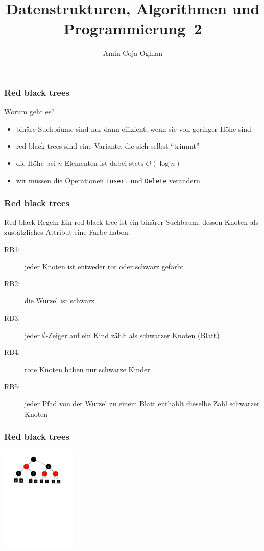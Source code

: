 \documentclass[aspectratio=1610, 11pt]{beamer}
\title{Datenstrukturen, Algorithmen und Programmierung~2}
\author[A.~Coja-Oghlan]{Amin Coja-Oghlan}
\institute[DAP2]{Lehrstuhl Informatik 2\\Fakult\"at f\"ur Informatik}
\newcommand{\mytitle}{Red black trees}
\begin{document}
\frame[plain]{\titlepage}

\begin{frame}\frametitle{\mytitle}
	\begin{exampleblock}{Worum geht es?}
		\begin{itemize}
			\item bin\"are Suchb\"aume sind nur dann effizient, wenn sie von geringer H\"ohe sind
			\item red black trees sind eine Variante, die sich selbst ``trimmt''
			\item die H\"ohe bei $n$ Elementen ist dabei stets $O(\log n)$
			\item wir m\"ussen die Operationen {\tt Insert} und {\tt Delete} ver\"andern
		\end{itemize}
	\end{exampleblock}
\end{frame}

\begin{frame}\frametitle{\mytitle}
	\begin{exampleblock}{Red black-Regeln}
		Ein red black tree ist ein bin\"arer Suchbaum, dessen Knoten als zust\"atzliches Attribut eine Farbe haben.
		\begin{description}
			\item[RB1:] jeder Knoten ist entweder rot oder schwarz gef\"arbt
			\item[RB2:] die Wurzel ist schwarz
			\item[RB3:] jeder $\emptyset$-Zeiger auf ein Kind z\"ahlt als schwarzer Knoten (Blatt)
			\item[RB4:] rote Knoten haben nur schwarze Kinder
			\item[RB5:] jeder Pfad von der Wurzel zu einem Blatt enth\"ahlt dieselbe Zahl schwarzer Knoten
		\end{description}
	\end{exampleblock}
\end{frame}

\begin{frame}\frametitle{\mytitle}
	\begin{center}
	\includegraphics[height=50mm]{./images/redblack1.pdf}
	\end{center}
\end{frame}
\end{document}
